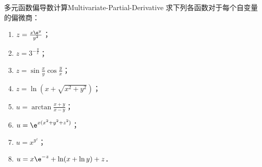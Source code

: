 \begin{problem}{多元函数偏导数计算}{Multivariate-Partial-Derivative}
    求下列各函数对于每个自变量的偏微商：
    \begin{enumerate}
        \item $z = \frac{x \e^y}{y^2}$；
        \item $z = 3^{-\frac{y}{x}}$；
        \item $z = \sin \frac{x}{y} \cos \frac{y}{x}$；
        \item $z = \ln(x + \sqrt{x^2 + y^2})$；
        \item $u = \arctan \frac{x + y}{x - y}$；
        \item $u = \e^{x(x^2 + y^2 + z^2)}$；
        \item $u = x^{y^z}$；
        \item $u = x \e^{-z} + \ln(x + \ln y) + z$．
    \end{enumerate}
\end{problem}

